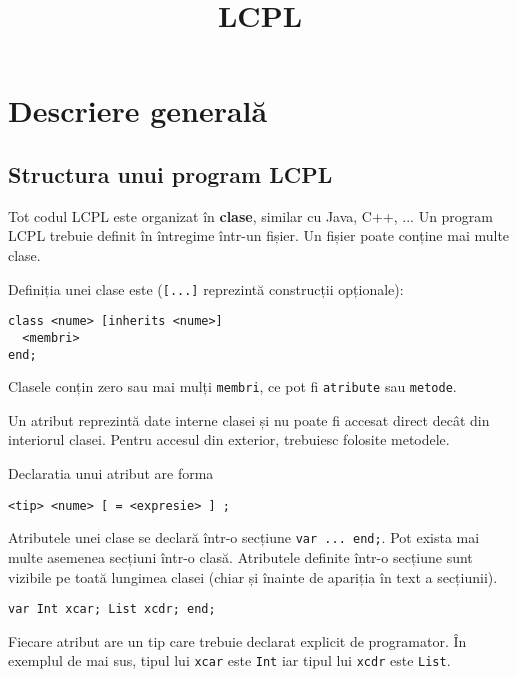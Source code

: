 \documentclass[12pt]{article}
\title{LCPL}
\begin{document}
\maketitle 

\section{Descriere generală}

%

\subsection{Structura unui program LCPL}

Tot codul LCPL este organizat în \textbf{clase}, similar cu Java, C++, ... Un program LCPL trebuie definit în întregime într-un fișier. Un fișier poate conține mai multe clase.

Definiția unei clase este (\texttt{[...]} reprezintă construcții opționale):

\begin{verbatim}
class <nume> [inherits <nume>]
  <membri>
end;
\end{verbatim}


Clasele conțin zero sau mai mulți \texttt{membri}, ce pot fi \texttt{atribute} sau \texttt{metode}.

Un atribut reprezintă date interne clasei și nu poate fi accesat direct decât din interiorul clasei. Pentru accesul din exterior, trebuiesc folosite metodele.

Declaratia unui atribut are forma

\begin{verbatim}
<tip> <nume> [ = <expresie> ] ;
\end{verbatim}

Atributele unei clase se declară într-o secțiune \texttt{var ... end;}. Pot exista mai multe asemenea secțiuni într-o clasă. Atributele definite într-o secțiune sunt vizibile pe toată lungimea clasei (chiar și înainte de apariția în text a secțiunii).

\begin{verbatim}
var Int xcar; List xcdr; end;
\end{verbatim}

Fiecare atribut are un tip care trebuie declarat explicit de programator. În exemplul de mai sus, tipul lui \texttt{xcar} este \texttt{Int} iar tipul lui \texttt{xcdr} este \texttt{List}.
\end{document}
